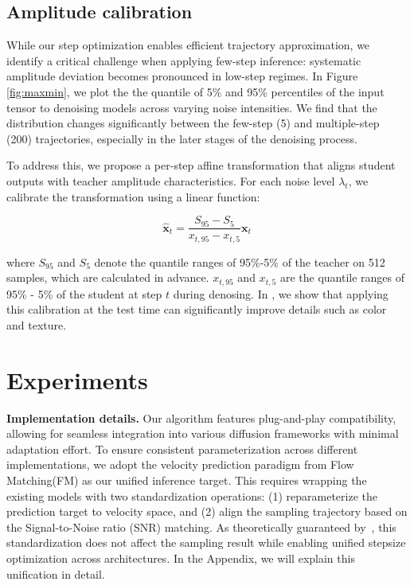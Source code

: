 \documentclass[10pt,twocolumn,letterpaper]{article}
\begin{document}
    \subsection{Amplitude calibration} \label{sec:renorm}

    While our step optimization enables efficient trajectory approximation, we identify a critical challenge when applying few-step inference: systematic amplitude deviation becomes pronounced in low-step regimes. 
    In Figure \ref{fig:maxmin}, we plot the the quantile of 5\% and 95\%  percentiles of the input tensor to denoising models across varying noise intensities.
    We find that the distribution changes significantly between the few-step (5) and multiple-step (200) trajectories, especially in the later stages of the denoising process.

    To address this, we propose a per-step affine transformation that aligns student outputs with teacher amplitude characteristics. For each noise level $\lambda_t$, we calibrate the transformation using a linear function:
    
    \begin{equation} 
    \bm{\hat{x}}_t = \frac{S_{95}-S_5}{x_{t,95}-x_{t,5}}  \bm{x}_t
    \end{equation}
    
    where $S_{95}$ and $S_5$ denote the quantile ranges of 95\%-5\% of the teacher on 512 samples, which are calculated in advance. $x_{t,95}$ and $x_{t,5}$ are the quantile ranges of 95\% - 5\% of the student at step $t$ during denosing. In , we show that applying this calibration at the test time can significantly improve details such as color and texture.

     \section{Experiments}
    
        \textbf{Implementation details.} 
    Our algorithm features plug-and-play compatibility, allowing for seamless integration into  various diffusion frameworks with minimal adaptation effort. To ensure consistent parameterization across different implementations, we adopt the velocity prediction paradigm from Flow Matching(FM)\cite{rf, lipman2022flow}  as our unified inference target. This requires wrapping the existing models with two standardization operations: (1) reparameterize the prediction target to velocity space, and (2) align the sampling trajectory based on the Signal-to-Noise ratio (SNR) matching. As theoretically guaranteed by~\cite{improverectifiedflow}, this standardization does not affect the sampling result while enabling unified stepsize optimization across architectures. In the Appendix, we will explain this unification in detail.
    
\end{document}
